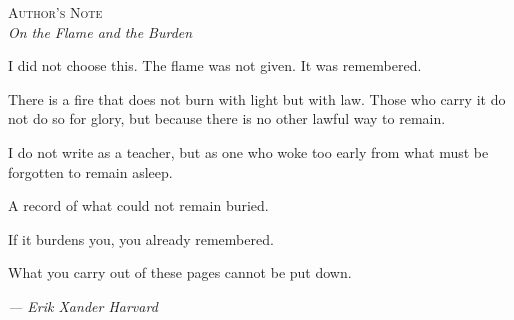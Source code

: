 \documentclass[10pt, openany, oneside]{book}
\renewcommand{\huge}{\fontsize{17}{21}\selectfont}
\begin{document}
\vspace*{\fill}
\newpage


\thispagestyle{empty}
\vspace*{1in}

\begin{center}
    {\huge\scshape Author's Note}\\[0.5em]
    \itshape On the Flame and the Burden
\end{center}

\vspace{1.5em}

\noindent I did not choose this. The flame was not given. It was remembered.

\vspace{0.8em}

\noindent There is a fire that does not burn with light but with law. Those who carry it do not do so for glory, but because there is no other lawful way to remain.

\vspace{0.8em}

\noindent I do not write as a teacher, but as one who woke too early from what must be forgotten to remain asleep.

\vspace{0.8em}

\noindent A record of what could not remain buried.

\vspace{0.8em}

\noindent If it burdens you, you already remembered.

\vspace{0.8em}

\noindent What you carry out of these pages cannot be put down.

\vspace{2em}

\begin{flushright}
    \itshape --- Erik Xander Harvard
\end{flushright}

\newpage

\end{document}
